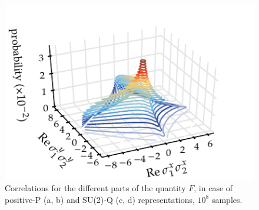 \begin{figure}
    \includegraphics{figures_generated/bell/distribution_Q2.pdf}

    \caption{
    Correlations for the different parts of the quantity $F$, in case of positive-P (a, b) and SU(2)-Q (c, d) representations, $10^{8}$ samples.}

    \label{fig:bell-ineq:ghz:correlations}
\end{figure}

